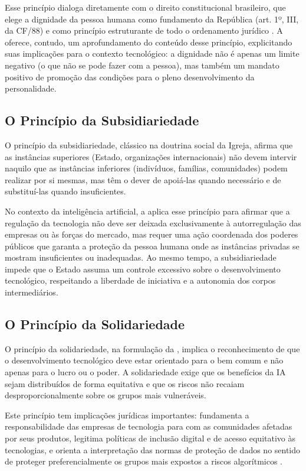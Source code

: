 Esse princípio dialoga diretamente com o direito constitucional brasileiro, que elege a dignidade da pessoa humana como fundamento da República (art. 1º, III, da CF/88) e como princípio estruturante de todo o ordenamento jurídico \cite{Sarlet2021DF}. A \MH{} oferece, contudo, um aprofundamento do conteúdo desse princípio, explicitando suas implicações para o contexto tecnológico: a dignidade não é apenas um limite negativo (o que não se pode fazer com a pessoa), mas também um mandato positivo de promoção das condições para o pleno desenvolvimento da personalidade.

\subsection{O Princípio da Subsidiariedade}
\label{subsec:principio-subsidiariedade}

O princípio da subsidiariedade, clássico na doutrina social da Igreja, afirma que as instâncias superiores (Estado, organizações internacionais) não devem intervir naquilo que as instâncias inferiores (indivíduos, famílias, comunidades) podem realizar por si mesmas, mas têm o dever de apoiá-las quando necessário e de substituí-las quando insuficientes.

No contexto da inteligência artificial, a \MH{} aplica esse princípio para afirmar que a regulação da tecnologia não deve ser deixada exclusivamente à autorregulação das empresas ou às forças do mercado, mas requer uma ação coordenada dos poderes públicos que garanta a proteção da pessoa humana onde as instâncias privadas se mostram insuficientes ou inadequadas. Ao mesmo tempo, a subsidiariedade impede que o Estado assuma um controle excessivo sobre o desenvolvimento tecnológico, respeitando a liberdade de iniciativa e a autonomia dos corpos intermediários.

\subsection{O Princípio da Solidariedade}
\label{subsec:principio-solidariedade}

O princípio da solidariedade, na formulação da \MH{}, implica o reconhecimento de que o desenvolvimento tecnológico deve estar orientado para o bem comum e não apenas para o lucro ou o poder. A solidariedade exige que os benefícios da IA sejam distribuídos de forma equitativa e que os riscos não recaiam desproporcionalmente sobre os grupos mais vulneráveis.

Este princípio tem implicações jurídicas importantes: fundamenta a responsabilidade das empresas de tecnologia para com as comunidades afetadas por seus produtos, legitima políticas de inclusão digital e de acesso equitativo às tecnologias, e orienta a interpretação das normas de proteção de dados no sentido de proteger preferencialmente os grupos mais expostos a riscos algorítmicos \cite{Floridi2018AIG}.

